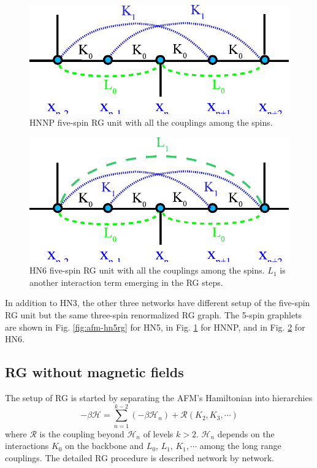 \begin{figure}
\centering \includegraphics[scale=0.68]{Chapter-3/IsingRG_HNNP_before}
\protect\caption{HNNP five-spin RG unit with all the couplings among the spins.}
\label{fig:afm-hnnprg} 
\end{figure}

\begin{figure}
\centering \includegraphics[scale=0.68]{Chapter-3/IsingRG_HN6_before}
\protect\caption{HN6 five-spin RG unit with all the couplings among the spins. $L_1$ is another interaction term emerging in the RG steps.}
\label{fig:afm-hn6rg}
\end{figure}

In addition to HN3, the other three networks have different setup of the five-spin RG unit but the same three-spin renormalized RG graph. The 5-spin graphlets are shown in Fig. \ref{fig:afm-hn5rg} \cite{Boettcher2011HNNP} for HN5, in Fig. \ref{fig:afm-hnnprg}  \cite{Boettcher2011HNNP} for HNNP, and in Fig. \ref{fig:afm-hn6rg} \cite{Boettcher2011HNNP} for HN6. 



\subsection{RG without magnetic fields}
The setup of RG is started by separating the AFM's Hamiltonian into hierarchies
\begin{equation}
-\beta\mathcal{H} = \sum_{n=1}^{k-2} (-\beta \mathcal{H}_n)+ \mathcal{R}(K_2, K_3, \cdots)
\end{equation}
where $\mathcal{R}$ is the coupling beyond $\mathcal{H}_n$ of levels $k>2$. $\mathcal{H}_n$ depends on the interactions $K_0$ on the backbone and $L_0$, $L_1$, $K_1, \cdots$ among the long range couplings. The detailed RG procedure is described network by network. 

